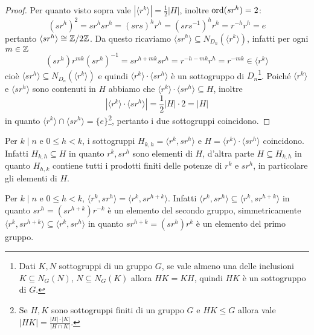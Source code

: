 \documentclass[11pt]{scrartcl}
\begin{document}
\begin{proof}
    Per quanto visto sopra vale $|\langle r^k\rangle| = 
    \displaystyle\frac 1 2|H|$, inoltre $\operatorname{ord}(sr^h) = 2$:
    \[
        (sr^h)^2 = sr^hsr^h = (srs)^hr^h = (srs^{-1})^hr^h = r^{-h}r^h = e
    \]
    pertanto $\langle sr^h\rangle \cong \mathbb{Z}/{2}\mathbb{Z}$. Da questo ricaviamo $\langle sr^h\rangle
    \subseteq N_{D_n}(\langle r^k\rangle)$, infatti per ogni $m \in \mathbb Z$ 
    \[
        (sr^h)r^{mk}(sr^h)^{-1} = sr^{h + mk} sr^h = r^{-h-mk}r^h = r^{-mk}
        \in \langle r^k \rangle
    \]
    cioè $\langle sr^h\rangle \subseteq N_{D_n}(\langle r^k\rangle)$ e quindi
    $\langle r^k\rangle\cdot\langle sr^h\rangle$ è un sottogruppo di $D_n$\footnote
    {Dati $K, N$ sottogruppi
    di un gruppo $G$, se vale almeno una delle inclusioni $K \subseteq N_G(N)$,
    $N \subseteq N_G(K)$ allora $HK = KH$, quindi $HK$ è un sottogruppo di $G$.}.
    Poiché $\langle r^k\rangle$ e $\langle sr^h\rangle$ sono contenuti in $H$
    abbiamo che $\langle r^k\rangle\cdot\langle sr^h\rangle \subseteq H$, inoltre
    \[|\langle r^k\rangle\cdot\langle sr^h\rangle| = \displaystyle\frac 1 2 |H|\cdot 2 = |H|\]
    in quanto $\langle r^k\rangle\cap\langle sr^h\rangle = \{e\}$\footnote{
        Se $H, K$ sono sottogruppi finiti di un gruppo $G$ e $HK\leqslant G$ allora
        vale $|HK| = \displaystyle\frac{|H|\cdot|K|}{|H\cap K|}$.
    }, pertanto 
    i due sottogruppi coincidono.
\end{proof}

\begin{remark}
    Per $k \mid n$ e $0\leq h < k$, i sottogruppi $H_{k, h} = \langle r^k, sr^h\rangle$
    e $H = \langle r^k\rangle\cdot\langle sr^h\rangle$ coincidono. Infatti 
    $H_{k, h}\subseteq H$ in quanto $r^k, sr^h$ sono elementi di $H$, 
    d'altra parte $H \subseteq H_{k, h}$ in quanto $H_{h, k}$ contiene tutti i 
    prodotti finiti delle potenze di $r^k$ e $sr^h$, in particolare gli elementi di $H$.
\end{remark}

\begin{remark}
    Per $k \mid n$ e $0\leq h < k$, $\langle r^k, sr^h\rangle = 
    \langle r^k, sr^{h + k}\rangle$. Infatti $\langle r^k, sr^h\rangle \subseteq
    \langle r^k, sr^{h + k}\rangle$ in quanto $sr^h = (sr^{h + k})r^{-k}$ è
    un elemento del secondo gruppo, simmetricamente $\langle r^k, sr^{h + k}\rangle
    \subseteq \langle r^k, sr^h\rangle$ in quanto $sr^{h + k} = (sr^h)r^k$ è un
    elemento del primo gruppo.
\end{remark}
\end{document}
